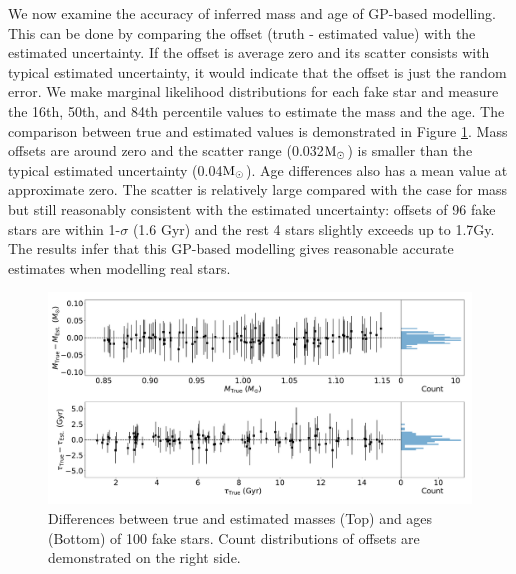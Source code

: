 We now examine the accuracy of inferred mass and age of GP-based modelling. This can be done by comparing the offset (truth - estimated value) with the estimated uncertainty. If the offset is average zero and its scatter consists with typical estimated uncertainty, it would indicate that the offset is just the random error.   
%
We make marginal likelihood distributions for each fake star and measure the 16th, 50th, and 84th percentile values to estimate the mass and the age. The comparison between true and estimated values is demonstrated in Figure \ref{fig:fake_test}. Mass offsets are around zero and the scatter range (0.032$\rm M_{\odot}$) is smaller than the typical estimated uncertainty (0.04$\rm M_{\odot}$). Age differences also has a mean value at approximate zero. The scatter is relatively large compared with the case for mass but still reasonably consistent with the estimated uncertainty: offsets of 96 fake stars are within 1-$\sigma$ (1.6 Gyr) and the rest 4 stars slightly exceeds up to 1.7Gy. The results infer that this GP-based modelling gives reasonable accurate estimates when modelling real stars.  

\begin{figure}
	\includegraphics[width=1.8\columnwidth]{fake-stars-test.pdf}
    \caption{Differences between true and estimated masses (Top) and ages (Bottom) of 100 fake stars. Count distributions of offsets are demonstrated on the right side.} 
  \label{fig:fake_test}
\end{figure}









